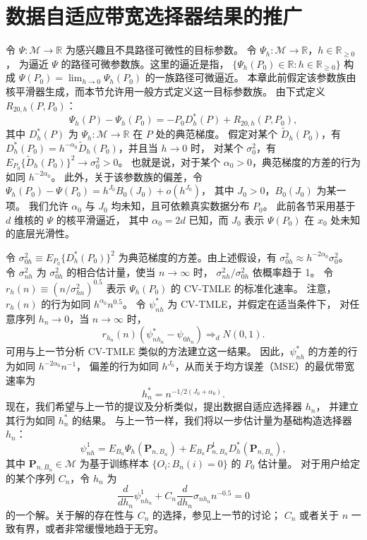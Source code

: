 \section{数据自适应带宽选择器结果的推广}

令 $\Psi:\mathcal M\to\mathbb R$ 为感兴趣且不具路径可微性的目标参数。
令 $\Psi_h:\mathcal M\to\mathbb R$，$h\in\mathbb R_{\geq0}$，
为逼近 $\Psi$ 的路径可微参数族。这里的逼近是指，
$\{\Psi_h(P_0)\in\mathbb R:h\in\mathbb R_{\geq0}\}$
构成 $\Psi(P_0)=\lim_{h\to0}\Psi_h(P_0)$ 的一族路径可微逼近。
本章此前假定该参数族由核平滑器生成，而本节允许用一般方式定义这一目标参数族。
由下式定义 $R_{20,h}(P,P_0)$：
\[
 \Psi_h(P)-\Psi_h(P_0)=-P_0D_h^*(P)+R_{20,h}(P,P_0),
\]
其中 $D_h^*(P)$ 为 $\Psi_h:\mathcal M\to\mathbb R$ 在 $P$ 处的典范梯度。
假定对某个 $\tilde D_h(P_0)$，有
$D_h^*(P_0)=h^{-\alpha_0}\tilde D_h(P_0)$，并且当 $h\to0$ 时，
对某个 $\sigma_0^2$，有 $E_{P_0}\{\tilde D_h(P_0)\}^2\to\sigma_0^2>0$。
也就是说，对于某个 $\alpha_0>0$，典范梯度的方差的行为如同 $h^{-2\alpha_0}$。
此外，关于该参数族的偏差，令
$\Psi_h(P_0)-\Psi(P_0)=h^{J_0}B_0(J_0)+o(h^{J_0})$，
其中 $J_0>0$，$B_0(J_0)$ 为某一项。
我们允许 $\alpha_0$ 与 $J_0$ 均未知，且可依赖真实数据分布 $P_0$。
此前各节采用基于 $d$ 维核的 $\Psi$ 的核平滑逼近，
其中 $\alpha_0=2d$ 已知，而 $J_0$ 表示 $\Psi(P_0)$ 在 $x_0$ 处未知的底层光滑性。

令 $\sigma_{0h}^2\equiv E_{P_0}\{D_h^*(P_0)\}^2$
为典范梯度的方差。由上述假设，有
$\sigma_{0h}^2\approx h^{-2\alpha_0}\sigma_0^2$。
令 $\sigma_{nh}^2$ 为 $\sigma_{0h}^2$ 的相合估计量，使当 $n\to\infty$ 时，
$\sigma_{nh}^2/\sigma_{0h}^2$ 依概率趋于 1。
令 $r_h(n)\equiv(n/\sigma_{hn}^2)^{0.5}$
表示 $\Psi_h(P_0)$ 的 CV-TMLE 的标准化速率。
注意，$r_h(n)$ 的行为如同 $h^{\alpha_0}n^{0.5}$。
令 $\psi_{nh}^*$ 为 CV-TMLE，并假定在适当条件下，
对任意序列 $h_n\to0$，当 $n\to\infty$ 时，
\[
 r_{h_n}(n)(\psi^*_{nh_n}-\psi_{0h_n})\Rightarrow_dN(0,1).
\]
可用与上一节分析 CV-TMLE 类似的方法建立这一结果。
因此，$\psi_{nh}^*$ 的方差的行为如同 $h^{-2\alpha_0}n^{-1}$，
偏差的行为如同 $h^{J_0}$，从而关于均方误差（MSE）的最优带宽速率为
\[
 h_n^*=n^{-1/2(J_0+\alpha_0)}.
\]
现在，我们希望与上一节的提议及分析类似，提出数据自适应选择器 $h_n$，
并建立其行为如同 $h_n^*$ 的结果。
与上一节一样，我们将以一步估计量为基础构造选择器 $h_n$：
\[
 \psi_{nh}^1=E_{B_n}\Psi_h(\mathbf P_{n,B_n})
 +E_{B_n}P^1_{n,B_n}D_h^*(\mathbf P_{n,B_n}),
\]
其中 $\mathbf P_{n,B_n}\in\mathcal M$ 为基于训练样本
$\{O_i:B_n(i)=0\}$ 的 $P_0$ 估计量。
对于用户给定的某个序列 $C_n$，令 $h_n$ 为
\[
 \frac{d}{dh_n}\psi^1_{nh_n}
 +C_n\frac{d}{dh_n}\sigma_{nh_n}n^{-0.5}=0
\]
的一个解。关于解的存在性与 $C_n$ 的选择，参见上一节的讨论；
$C_n$ 或者关于 $n$ 一致有界，或者非常缓慢地趋于无穷。

